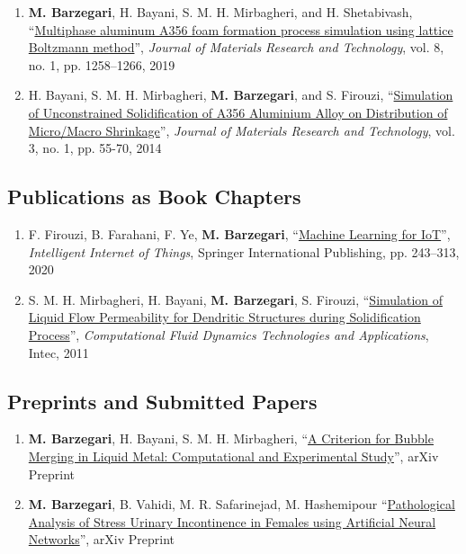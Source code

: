 \documentclass{cv}
\begin{document}
\begin{enumerate}
\item
\textbf{M. Barzegari}, H. Bayani, S. M. H. Mirbagheri, and H. Shetabivash, “\href{https://doi.org/10.1016/j.jmrt.2018.03.010}{Multiphase aluminum A356 foam formation process simulation using lattice Boltzmann method}'', \textit{Journal of Materials Research and Technology}, vol. 8, no. 1, pp. 1258–1266, 2019
\item
H. Bayani, S. M. H. Mirbagheri, \textbf{M. Barzegari}, and S. Firouzi, ``\href{http://www.sciencedirect.com/science/article/pii/S2238785413001129}{Simulation of Unconstrained Solidification of A356 Aluminium Alloy on Distribution of Micro/Macro Shrinkage}'', \textit{Journal of Materials Research and Technology}, vol. 3, no. 1, pp. 55-70, 2014
\end{enumerate}

\subsection{Publications as Book Chapters}

\begin{enumerate}
\item
F. Firouzi, B. Farahani, F. Ye, \textbf{M. Barzegari}, “\href{https://link.springer.com/chapter/10.1007\%2F978-3-030-30367-9_5}{Machine Learning for IoT}'', \textit{Intelligent Internet of Things}, Springer International Publishing, pp. 243–313, 2020
\item
S. M. H. Mirbagheri, H. Bayani, \textbf{M. Barzegari}, S. Firouzi, ``\href{https://www.intechopen.com/books/computational-fluid-dynamics-technologies-and-applications/simulation-of-liquid-flow-permeability-for-dendritic-structures-during-solidification-process}{Simulation of Liquid Flow Permeability for Dendritic Structures during Solidification Process}'', \textit{Computational Fluid Dynamics Technologies and Applications}, Intec, 2011
\end{enumerate}

\subsection{Preprints and Submitted Papers}
\begin{enumerate}
\item
\textbf{M. Barzegari}, H. Bayani, S. M. H. Mirbagheri, ``\href{https://arxiv.org/abs/1708.01608}{A Criterion for Bubble Merging in Liquid Metal: Computational and Experimental Study}'', arXiv Preprint
\item
\textbf{M. Barzegari}, B. Vahidi, M. R. Safarinejad, M. Hashemipour ``\href{https://arxiv.org/abs/1803.01843}{Pathological Analysis of Stress Urinary Incontinence in Females using Artificial Neural Networks}'', arXiv Preprint
\end{enumerate}
\end{document}
